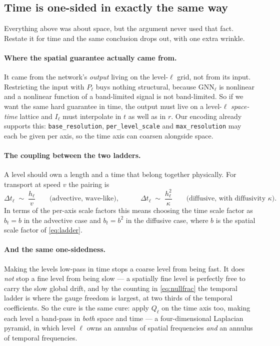 \documentclass[11pt,a4paper]{article}
\begin{document}
\subsection{Time is one-sided in exactly the same way}
\label{sec:time}

Everything above was about space, but the argument never used that fact. Restate it for
time and the same conclusion drops out, with one extra wrinkle.

\paragraph{Where the spatial guarantee actually came from.} It came from the network's
\emph{output} living on the level-$\ell$ grid, not from its input. Restricting the input
with $P_\ell$ buys nothing structural, because $\mathrm{GNN}_\ell$ is nonlinear and a
nonlinear function of a band-limited signal is not band-limited. So if we want the same
hard guarantee in time, the output must live on a level-$\ell$ \emph{space-time} lattice
and $I_\ell$ must interpolate in $t$ as well as in $r$. Our encoding already supports this:
\texttt{base\_resolution}, \texttt{per\_level\_scale} and \texttt{max\_resolution} may each
be given per axis, so the time axis can coarsen alongside space.

\paragraph{The coupling between the two ladders.} A level should own a length and a time
that belong together physically. For transport at speed $v$ the pairing is
\begin{equation}
\Delta t_\ell \;\sim\; \frac{h_\ell}{v}
\qquad\text{(advective, wave-like)} ,
\qquad\quad
\Delta t_\ell \;\sim\; \frac{h_\ell^{2}}{\kappa}
\qquad\text{(diffusive, with diffusivity $\kappa$)} .
\label{eq:cfl}
\end{equation}
In terms of the per-axis scale factors this means choosing the time scale factor as $b_t =
b$ in the advective case and $b_t = b^{2}$ in the diffusive case, where $b$ is the spatial
scale factor of \eqref{eq:ladder}.

\paragraph{And the same one-sidedness.} Making the levels low-pass in time stops a coarse
level from being fast. It does \emph{not} stop a fine level from being slow --- a spatially
fine level is perfectly free to carry the slow global drift, and by the counting in
\eqref{eq:nullfrac} the temporal ladder is where the gauge freedom is largest, at two
thirds of the temporal coefficients. So the cure is the same cure: apply $Q_\ell$ on the
time axis too, making each level a band-pass in \emph{both} space and
time --- a four-dimensional Laplacian pyramid, in which level $\ell$ owns an annulus of
spatial frequencies \emph{and} an annulus of temporal frequencies.
\end{document}
